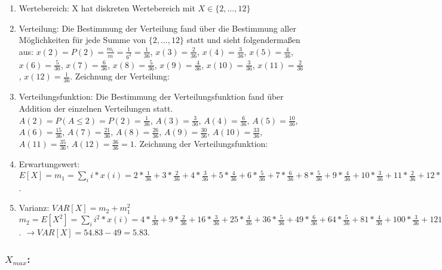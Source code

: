 \documentclass[%
10pt,              %
ngerman,           %
a4paper,           %
DIV11,             %
]{scrartcl}%
\begin{document}
\begin{enumerate}
	\item Wertebereich: X hat diskreten Wertebereich mit $X \in \{2, \dots, 12 \}$
	\item Verteilung: Die Bestimmung der Verteilung fand über die Bestimmung aller Möglichkeiten für jede Summe von $\{2, \dots, 12 \}$ statt und sieht folgendermaßen aus:\newline
	$x(2) = P(2) = \frac{m_i}{m} = \frac{1}{6^2} = \frac{1}{36}$,\newline
	$x(3) = \frac{2}{36}$, $x(4) = \frac{3}{36}$, $x(5) = \frac{4}{36}$, $x(6) = \frac{5}{36}$, $x(7) = \frac{6}{36}$, $x(8) = \frac{5}{36}$, $x(9) = \frac{4}{36}$, $x(10) = \frac{3}{36}$, $x(11) = \frac{2}{36}$, $x(12) = \frac{1}{36}$. Zeichnung der Verteilung: 
	
	\item Verteilungsfunktion: Die Bestimmung der Verteilungsfunktion fand über Addition der einzelnen Verteilungen statt.\newline
	$A(2) = P(A \leq 2) = P(2) = \frac{1}{36}$,\newline
	$A(3) = \frac{3}{36}$, $A(4) = \frac{6}{36}$, $A(5) = \frac{10}{36}$, $A(6) = \frac{15}{36}$, $A(7) = \frac{21}{36}$, $A(8) = \frac{26}{36}$, $A(9) = \frac{30}{36}$, $A(10) = \frac{33}{36}$, $A(11) = \frac{35}{36}$, $A(12) = \frac{36}{36} = 1$. Zeichnung der Verteilungsfunktion: 
	
	\item Erwartungswert: $E[X] = m_1 = \sum_{i} i * x(i) = 2 * \frac{1}{36} + 3 * \frac{2}{36} + 4 * \frac{3}{36} + 5 * \frac{4}{36} + 6 * \frac{5}{36} + 7 * \frac{6}{36} + 8 * \frac{5}{36} + 9 * \frac{4}{36} + 10 * \frac{3}{36} + 11 * \frac{2}{36} + 12 * \frac{1}{36} = 7$.
	\item Varianz: $VAR[X] = m_2 + m_1^2$\newline
	$m_2 = E[X^2] = \sum_{i} i^2 * x(i) = 4 * \frac{1}{36} + 9 * \frac{2}{36} + 16 * \frac{3}{36} + 25 * \frac{4}{36} + 36 * \frac{5}{36} + 49 * \frac{6}{36} + 64 * \frac{5}{36} + 81 * \frac{4}{36} + 100 * \frac{3}{36} + 121 * \frac{2}{36} + 144 * \frac{1}{36} \approx 54.83$.\newline
	$\rightarrow VAR[X] = 54.83 - 49 = 5.83$.
\end{enumerate}

\subsubsection*{$X_{max}$:}
\end{document}
